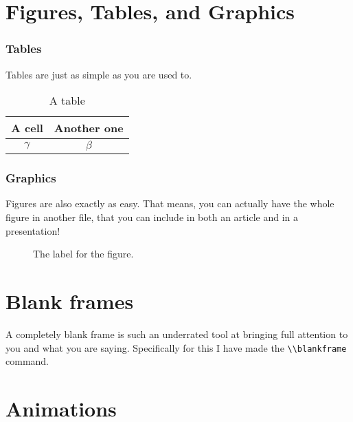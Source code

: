 \documentclass[english, aspectratio=169]{beamer}
\begin{document}
\section{Figures, Tables, and Graphics}
\begin{frame}
  \frametitle{Tables}
  Tables are just as simple as you are used to.

  \begin{table}
    \centering
    \begin{tabular}{c|c}
      A cell & Another one
      \\ \hline
      $\gamma$ & $\beta$
    \end{tabular}
    
    \caption{A table}
    \label{tab:label}
  \end{table}  
\end{frame}


\begin{frame}
  \frametitle{Graphics}
  Figures are also exactly as easy. That means, you can actually have the whole
  figure in another file, that you can include in both an article and in a
  presentation!

  \begin{figure}
    \centering
    

    \caption{The label for the figure.}
    \label{fig:label}
  \end{figure}
\end{frame}

\section{Blank frames}

\begin{frame}
  A completely blank frame is such an underrated tool at bringing full attention
  to you and what you are saying. Specifically for this I have made the
  \lstinline{\\blankframe} command.
\end{frame}

\blankframe

\section{Animations}
\end{document}
